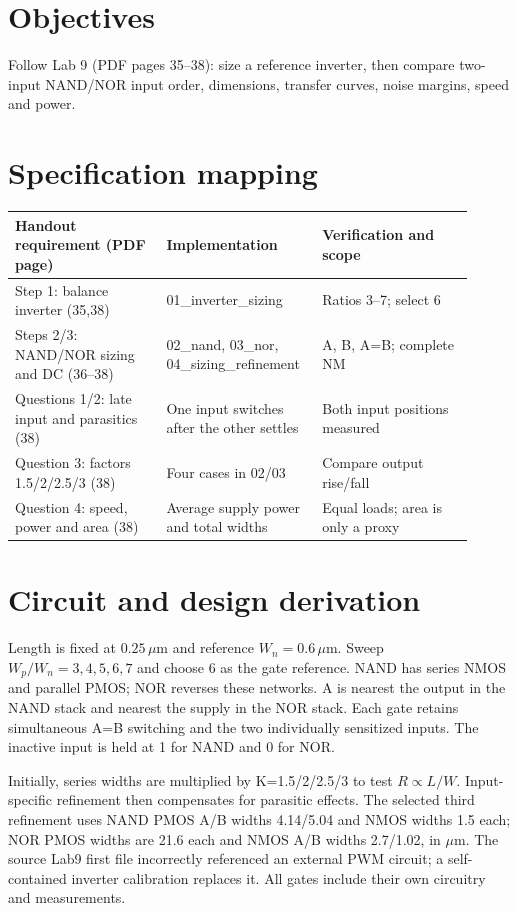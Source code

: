 \section{Objectives}
Follow Lab 9 (PDF pages 35--38): size a reference inverter, then compare two-input NAND/NOR input order, dimensions, transfer curves, noise margins, speed and power.

\section{Specification mapping}
\begin{longtable}{p{0.31\linewidth}p{0.29\linewidth}p{0.31\linewidth}}
\toprule
Handout requirement (PDF page) & Implementation & Verification and scope \\\midrule
Step 1: balance inverter (35,38) & 01\_inverter\_sizing & Ratios 3--7; select 6 \\
Steps 2/3: NAND/NOR sizing and DC (36--38) & 02\_nand, 03\_nor, 04\_sizing\_refinement & A, B, A=B; complete NM \\
Questions 1/2: late input and parasitics (38) & One input switches after the other settles & Both input positions measured \\
Question 3: factors 1.5/2/2.5/3 (38) & Four cases in 02/03 & Compare output rise/fall \\
Question 4: speed, power and area (38) & Average supply power and total widths & Equal loads; area is only a proxy \\
\bottomrule
\end{longtable}


\section{Circuit and design derivation}
Length is fixed at $0.25\,\mu$m and reference $W_n=0.6\,\mu$m. Sweep $W_p/W_n=3,4,5,6,7$ and choose 6 as the gate reference. NAND has series NMOS and parallel PMOS; NOR reverses these networks. A is nearest the output in the NAND stack and nearest the supply in the NOR stack. Each gate retains simultaneous A=B switching and the two individually sensitized inputs. The inactive input is held at 1 for NAND and 0 for NOR.

Initially, series widths are multiplied by K=1.5/2/2.5/3 to test $R\propto L/W$. Input-specific refinement then compensates for parasitic effects. The selected third refinement uses NAND PMOS A/B widths 4.14/5.04 and NMOS widths 1.5 each; NOR PMOS widths are 21.6 each and NMOS A/B widths 2.7/1.02, in $\mu$m. The source Lab9 first file incorrectly referenced an external PWM circuit; a self-contained inverter calibration replaces it. All gates include their own circuitry and measurements.

